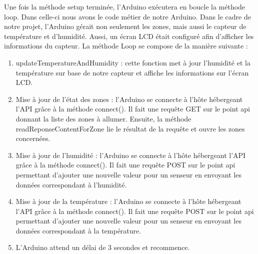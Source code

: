 Une fois la méthode setup terminée, l’Arduino exécutera en boucle la méthode loop. Dans celle-ci nous avons le code métier de notre Arduino. Dans le cadre de notre projet, l’Arduino gérait non seulement les zones, mais aussi le capteur de température et d’humidité. Aussi, un écran LCD était configuré afin d’afficher les informations du capteur. La méthode Loop se compose de la manière suivante :
\begin{enumerate}
\item updateTemperatureAndHumidity : cette fonction met à jour l’humidité et la température sur base de notre capteur et affiche les informations sur l’écran LCD. 
\item Mise à jour de l’état des zones : l’Arduino se connecte à l’hôte hébergeant l’API grâce à la méthode connect(). Il fait une requête GET sur le point api donnant la liste des zones à allumer. Ensuite, la méthode readReponseContentForZone lie le résultat de la requête et ouvre les zones concernées. 
\item Mise à jour de l’humidité : l’Arduino se connecte à l’hôte hébergeant l’API grâce à la méthode connect(). Il fait une requête POST sur le point api permettant d’ajouter une nouvelle valeur pour un senseur en envoyant les données correspondant à l’humidité.
\item Mise à jour de la température : l’Arduino se connecte à l’hôte hébergeant l’API grâce à la méthode connect(). Il fait une requête POST sur le point api permettant d’ajouter une nouvelle valeur pour un senseur en envoyant les données correspondant à la température.
\item L’Arduino attend un délai de 3 secondes et recommence. 
\end{enumerate}

